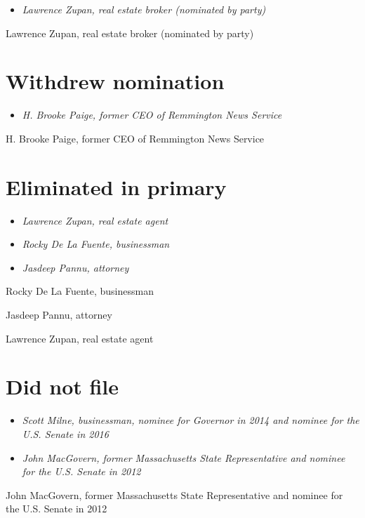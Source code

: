 \begin{itemize}
\item
  \emph{Lawrence Zupan, real estate broker (nominated by party)}
\end{itemize}

Lawrence Zupan, real estate broker (nominated by party)

\section{Withdrew nomination}\label{withdrew-nomination}

\begin{itemize}
\item
  \emph{H. Brooke Paige, former CEO of Remmington News Service}
\end{itemize}

H. Brooke Paige, former CEO of Remmington News Service

\section{Eliminated in primary}\label{eliminated-in-primary-1}

\begin{itemize}
\item
  \emph{Lawrence Zupan, real estate agent}
\item
  \emph{Rocky De La Fuente, businessman}
\item
  \emph{Jasdeep Pannu, attorney}
\end{itemize}

Rocky De La Fuente, businessman

Jasdeep Pannu, attorney

Lawrence Zupan, real estate agent

\section{Did not file}\label{did-not-file}

\begin{itemize}
\item
  \emph{Scott Milne, businessman, nominee for Governor in 2014 and
  nominee for the U.S. Senate in 2016}
\item
  \emph{John MacGovern, former Massachusetts State Representative and
  nominee for the U.S. Senate in 2012}
\end{itemize}

John MacGovern, former Massachusetts State Representative and nominee
for the U.S. Senate in 2012

